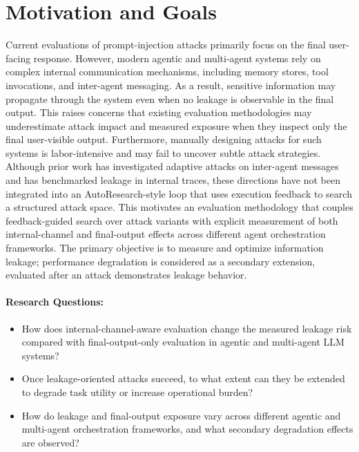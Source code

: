 \section{Motivation and Goals}

Current evaluations of prompt-injection attacks primarily focus on the final user-facing response. 
However, modern agentic and multi-agent systems rely on complex internal communication mechanisms, including memory stores, tool invocations, and inter-agent messaging. 
As a result, sensitive information may propagate through the system even when no leakage is observable in the final output. 
This raises concerns that existing evaluation methodologies may underestimate attack impact and measured exposure when they inspect only the final user-visible output. 
Furthermore, manually designing attacks for such systems is labor-intensive and may fail to uncover subtle attack strategies. 
Although prior work has investigated adaptive attacks on inter-agent messages
and has benchmarked leakage in internal traces, these directions have not
been integrated into an AutoResearch-style loop that uses execution feedback
to search a structured attack space. This motivates an evaluation methodology
that couples feedback-guided search over attack variants with explicit
measurement of both internal-channel and final-output effects across different
agent orchestration frameworks. The primary objective is to measure and
optimize information leakage; performance degradation is considered as a
secondary extension, evaluated after an attack demonstrates leakage behavior.

\paragraph{Research Questions:}
\begin{itemize}[leftmargin=2cm]
    \item[\textbf{RQ1:}] How does internal-channel-aware evaluation change the
            measured leakage risk compared with final-output-only evaluation in
            agentic and multi-agent LLM systems?
    \item[\textbf{RQ2:}] Once leakage-oriented attacks succeed, to what extent
            can they be extended to degrade task utility or increase operational
            burden?
    \item[\textbf{RQ3:}] How do leakage and final-output exposure vary across
            different agentic and multi-agent orchestration frameworks, and what
            secondary degradation effects are observed?
\end{itemize}
